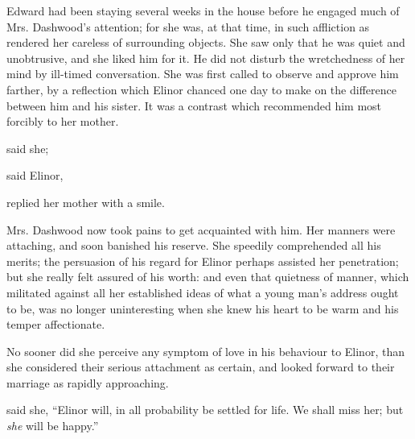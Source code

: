Edward had been staying several weeks in the house before he engaged much of Mrs. Dashwood's attention; for she was, at that time, in such affliction as rendered her careless of surrounding objects. She saw only that he was quiet and unobtrusive, and she liked him for it. He did not disturb the wretchedness of her mind by ill-timed conversation. She was first called to observe and approve him farther, by a reflection which Elinor chanced one day to make on the difference between him and his sister. It was a contrast which recommended him most forcibly to her mother.

 said she; 

 said Elinor, 

 replied her mother with a smile. 



Mrs. Dashwood now took pains to get acquainted with him. Her manners were attaching, and soon banished his reserve. She speedily comprehended all his merits; the persuasion of his regard for Elinor perhaps assisted her penetration; but she really felt assured of his worth: and even that quietness of manner, which militated against all her established ideas of what a young man's address ought to be, was no longer uninteresting when she knew his heart to be warm and his temper affectionate.

No sooner did she perceive any symptom of love in his behaviour to Elinor, than she considered their serious attachment as certain, and looked forward to their marriage as rapidly approaching.

 said she, “Elinor will, in all probability be settled for life. We shall miss her; but {\em she} will be happy.”



